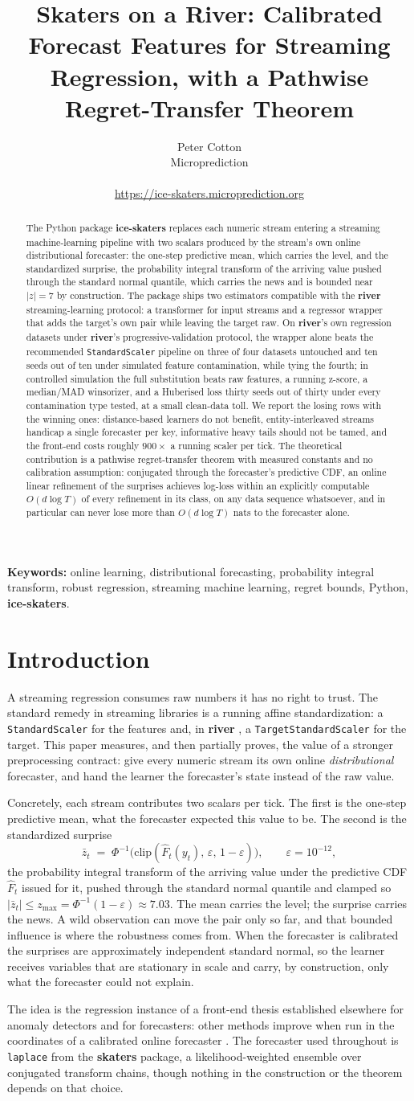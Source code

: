 \documentclass[article]{jss}
\author{
  Peter Cotton\\
  Microprediction\\
  \email{peter.cotton@microprediction.com}\\
  \url{https://ice-skaters.microprediction.org}
}
\title{Skaters on a River: Calibrated Forecast Features for Streaming Regression, with a Pathwise Regret-Transfer Theorem}
\providecommand{\proglang}[1]{\textsf{#1}}
\providecommand{\pkg}[1]{\textbf{#1}}
\providecommand{\code}[1]{\texttt{#1}}
\theoremstyle{remark}
\newcommand{\zmax}{z_{\max}}
\newcommand{\iceabstract}{
The \proglang{Python} package \pkg{ice-skaters} replaces each numeric stream
entering a streaming machine-learning pipeline with two scalars produced by
the stream's own online distributional forecaster: the one-step predictive
mean, which carries the level, and the standardized surprise, the probability
integral transform of the arriving value pushed through the standard normal
quantile, which carries the news and is bounded near $|z| = 7$ by
construction. The package ships two estimators compatible with the
\pkg{river} streaming-learning protocol: a transformer for input streams and
a regressor wrapper that adds the target's own pair while leaving the target
raw. On \pkg{river}'s own regression datasets under \pkg{river}'s
progressive-validation protocol, the wrapper alone beats the recommended
\code{StandardScaler} pipeline on three of four datasets untouched and ten
seeds out of ten under simulated feature contamination, while tying the
fourth; in controlled simulation the full substitution beats raw features, a
running z-score, a median/MAD winsorizer, and a Huberised loss thirty seeds
out of thirty under every contamination type tested, at a small clean-data
toll. We report the losing rows with the winning ones: distance-based
learners do not benefit, entity-interleaved streams handicap a single
forecaster per key, informative heavy tails should not be tamed, and the
front-end costs roughly $900\times$ a running scaler per tick. The
theoretical contribution is a pathwise regret-transfer theorem with measured
constants and no calibration assumption: conjugated through the forecaster's
predictive CDF, an online linear refinement of the surprises achieves
log-loss within an explicitly computable $O(d \log T)$ of every refinement in
its class, on any data sequence whatsoever, and in particular can never lose
more than $O(d \log T)$ nats to the forecaster alone.
}
\begin{document}
\maketitle

\begin{abstract}
\iceabstract
\end{abstract}

\noindent\textbf{Keywords:} online learning, distributional forecasting,
probability integral transform, robust regression, streaming machine
learning, regret bounds, \proglang{Python}, \pkg{ice-skaters}.

\section{Introduction} \label{sec:intro}

A streaming regression consumes raw numbers it has no right to trust. The
standard remedy in streaming libraries is a running affine standardization: a
\code{StandardScaler} for the features and, in \pkg{river}
\citep{montiel2021river}, a \code{TargetStandardScaler} for the target. This
paper measures, and then partially proves, the value of a stronger
preprocessing contract: give every numeric stream its own online
\emph{distributional} forecaster, and hand the learner the forecaster's state
instead of the raw value.

Concretely, each stream contributes two scalars per tick. The first is the
one-step predictive mean, what the forecaster expected this value to be. The
second is the standardized surprise
\begin{equation}
  \bar z_t \;=\; \Phi^{-1}\!\big(\mathrm{clip}(\hat F_t(y_t),\,
  \varepsilon,\, 1-\varepsilon)\big), \qquad \varepsilon = 10^{-12},
  \label{eq:surprise}
\end{equation}
the probability integral transform \citep{rosenblatt1952} of the arriving
value under the predictive CDF $\hat F_t$ issued for it, pushed through the
standard normal quantile and clamped so $|\bar z_t| \le \zmax =
\Phi^{-1}(1-\varepsilon) \approx 7.03$. The mean carries the level; the
surprise carries the news. A wild observation can move the pair only so far,
and that bounded influence is where the robustness comes from. When the
forecaster is calibrated the surprises are approximately independent standard
normal, so the learner receives variables that are stationary in scale and
carry, by construction, only what the forecaster could not explain.

The idea is the regression instance of a front-end thesis established
elsewhere for anomaly detectors and for forecasters: other methods improve
when run in the coordinates of a calibrated online forecaster
\citep{cotton2026skaters}. The forecaster used throughout is \code{laplace}
from the \pkg{skaters} package, a likelihood-weighted ensemble over
conjugated transform chains, though nothing in the construction or the
theorem depends on that choice.
\end{document}
